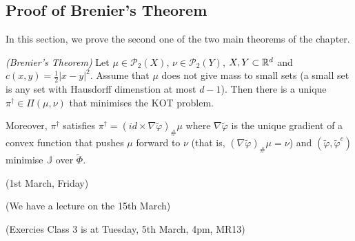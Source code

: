 \documentclass[12pt,a4paper]{article}
\begin{document}
\subsection{Proof of Brenier's Theorem}

In this section, we prove the second one of the two main theorems of the chapter.
\s

 \emph{(Brenier's Theorem)} Let $\mu \in \mathscr{P}_2(X)$, $\nu \in \mathscr{P}_2(Y)$, $X, Y\subset \mathbb{R}^d$ and $c(x,y) = \frac{1}{2} |x-y|^2$. Assume that $\mu$ does not give mass to small sets (a small set is any set with Hausdorff dimenstion at most $d-1$). Then there is a unique $\pi^{\dagger} \in \Pi(\mu, \nu)$ that minimises the KOT problem.

\quad Moreover, $\pi^{\dagger}$ satisfies $\pi^{\dagger} = (id \times \nabla \tilde{\varphi})_{\#} \mu$ where $\nabla \tilde{\varphi}$ is the unique gradient of a convex function that pushes $\mu$ forward to $\nu$ (that is, $(\nabla \tilde{\varphi})_{\#} \mu = \nu$) and $(\tilde{\varphi},\tilde{\varphi}^c)$ minimise $\mathbb{J}$ over $\tilde{\Phi}$.
\s

\newday

(1st March, Friday)
\s

(We have a lecture on the 15th March)

(Exercies Class 3 is at Tuesday, 5th March, 4pm, MR13)
\s
\end{document}
